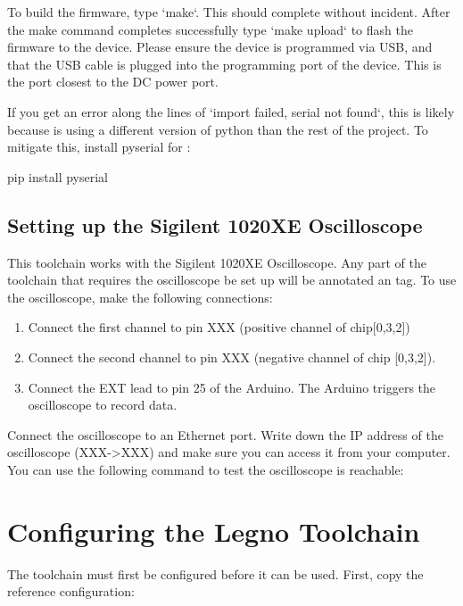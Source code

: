 To build the firmware, type `make`. This should complete without incident. After the make command completes 
successfully type `make upload` to flash the firmware to the device. Please ensure the device is programmed via USB,
and that the USB cable is plugged into the programming port of the device. This is the port closest to the DC power port. 

If you get an error along the lines of `import failed, serial not found`, this is likely because  is using 
a different version of python than the rest of the project. To mitigate this, install pyserial for :

\begin{snippet}
pip install pyserial
\end{snippet}


\subsection{Setting up the Sigilent 1020XE Oscilloscope}\label{setup-osc}

This toolchain works with the Sigilent 1020XE Oscilloscope. Any part of the
toolchain that requires the oscilloscope be set up will be annotated 
an \tx{[OSC]} tag. To use the oscilloscope, make the following connections:

\begin{enumerate}
  \item Connect the first channel to pin XXX (positive channel of
    chip[0,3,2])
  \item Connect the second channel to pin XXX (negative channel of chip
    [0,3,2]).
  \item Connect the EXT lead to pin 25 of the Arduino. The Arduino triggers the
    oscilloscope to record data.
\end{enumerate}

Connect the oscilloscope to an Ethernet port. Write down the IP address
of the oscilloscope (XXX->XXX) and make sure you can access it from your
computer. You can use the following command to test the oscilloscope is
reachable:
\begin{snippet}

\end{snippet}


\section{Configuring the Legno Toolchain}

The \legno toolchain must first be configured before it can be used. First, copy
the reference configuration:


